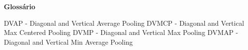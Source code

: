 \begin{center}
\textbf{Glossário}
\end{center}
\hfill\newline
\hfill\newline

\begin{flushleft}
DVAP - Diagonal and Vertical Average Pooling\hfill\newline
DVMCP - Diagonal and Vertical Max Centered Pooling\hfill\newline
DVMP - Diagonal and Vertical Max Pooling\hfill\newline
DVMAP - Diagonal and Vertical Min Average Pooling\hfill\newline
\end{flushleft}